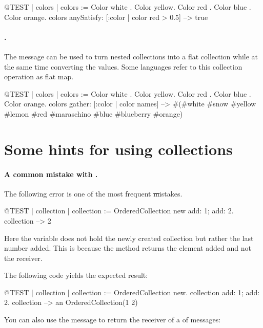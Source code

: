 \documentclass[a4paper,10pt,twoside]{book}
\begin{document}
\begin{code}{@TEST | colors | colors := {Color white . Color yellow. Color red . Color blue . Color orange}.}
colors anySatisfy: [:color | color red > 0.5] --> true
\end{code}

\paragraph{.}
The message  can be used to turn nested collections into a flat collection while at the same time converting the values. Some languages refer to this collection operation as flat map.

\begin{code}{@TEST | colors | colors := {Color white . Color yellow. Color red . Color blue . Color orange}.}
colors gather: [:color | color names] --> #(#white #snow #yellow #lemon #red #maraschino #blue #blueberry #orange)
\end{code}

\section{Some hints for using collections}

\paragraph{A common mistake with .}
The following error is one of the most frequent \st mistakes.

\begin{code}{@TEST | collection | }
collection := OrderedCollection new add: 1; add: 2.
collection --> 2
\end{code}
\noindent
Here the variable  does not hold the newly created collection but rather the last number added.
This is because the method  returns the element added and not the receiver.

The following code yields the expected result:
\begin{code}{@TEST | collection |}
collection := OrderedCollection new.
collection add: 1; add: 2.
collection --> an OrderedCollection(1 2)
\end{code}

You can also use the message  to return the receiver of a  of messages:
\end{document}
